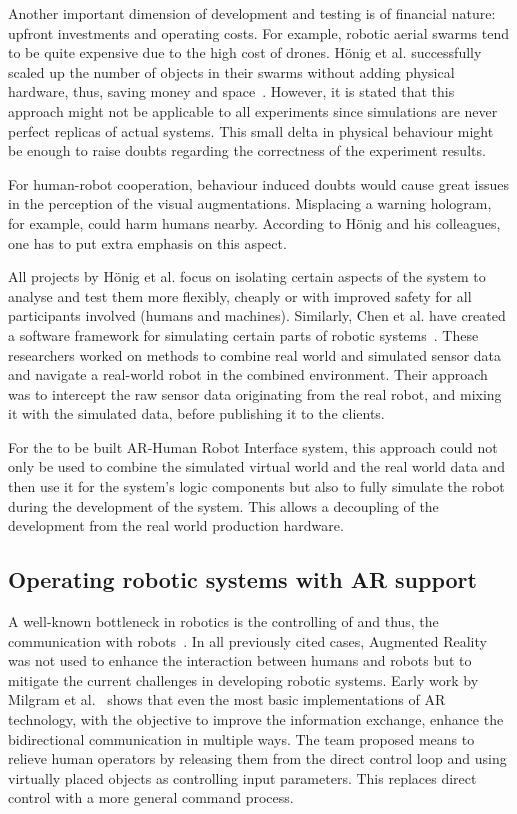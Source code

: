 Another important dimension of development and testing is of financial nature: upfront investments and operating costs. For example, robotic aerial swarms tend to be quite expensive due to the high cost of drones. Hönig et al. successfully scaled up the number of objects in their swarms without adding physical hardware, thus, saving money and space~\cite{hoenig2015mixed}. However, it is stated that this approach might not be applicable to all experiments since simulations are never perfect replicas of actual systems. This small delta in physical behaviour might be enough to raise doubts regarding the correctness of the experiment results. 

For human-robot cooperation, behaviour induced doubts would cause great issues in the perception of the visual augmentations. Misplacing a warning hologram, for example, could harm humans nearby. According to Hönig and his colleagues, one has to put extra emphasis on this aspect. 

All projects by Hönig et al. focus on isolating certain aspects of the system to analyse and test them more flexibly, cheaply or with improved safety for all participants involved (humans and machines). Similarly, Chen et al. have created a software framework for simulating certain parts of robotic systems~\cite{chen2009mixed}. These researchers worked on methods to combine real world and simulated sensor data and navigate a real-world robot in the combined environment. Their approach was to intercept the raw sensor data originating from the real robot, and mixing it with the simulated data, before publishing it to the clients.

For the to be built AR-Human Robot Interface system, this approach could not only be used to combine the simulated virtual world and the real world data and then use it for the system's logic components but also to fully simulate the robot during the development of the system. This allows a decoupling of the development from the real world production hardware.

\subsection{Operating robotic systems with AR support}
A well-known bottleneck in robotics is the controlling of and thus, the communication with robots~\cite{RoboticsScienceMag}. In all previously cited cases, Augmented Reality was not used to enhance the interaction between humans and robots but to mitigate the current challenges in developing robotic systems. Early work by Milgram et al.~\cite{milgram1993applications} shows that even the most basic implementations of AR technology, with the objective to improve the information exchange, enhance the bidirectional communication in multiple ways. The team proposed means to relieve human operators by releasing them from the direct control loop and using virtually placed objects as controlling input parameters. This replaces direct control with a more general command process.

